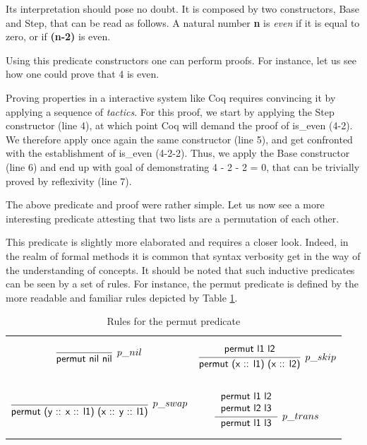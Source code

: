 			
	
	
	\noindent Its interpretation should pose no doubt. It is composed by two
	constructors, \textsf{Base} and \textsf{Step}, that can be read as follows.
	A natural number \textbf{n} is \textit{even} if it is equal to zero, 
	or if \textbf{(n-2)} is even. 
	
	Using this predicate constructors one can perform proofs. For instance,
	let us see how one could prove that 4 is even.
	
	
			
	
	\noindent Proving properties in a interactive system like Coq
	requires convincing it by applying a sequence of \textit{tactics}. For this 
	proof,	we start by applying the \textsf{Step} constructor (line 4), at which point
	Coq will demand the proof of \textsf{is\_even (4-2)}. We therefore apply once again
	the same constructor (line 5), and get confronted with the establishment of
	\textsf{is\_even (4-2-2)}. Thus, we apply the \textsf{Base} constructor (line 6)
	and end up with goal of demonstrating \textsf{4 - 2 - 2 = 0}, that can be
	trivially proved by reflexivity (line 7).
	
	The above predicate and proof were rather simple. Let us now see a more interesting
	predicate attesting that two lists are a permutation of each other.
		 
	
	
	\noindent This predicate is slightly more elaborated and requires a closer
	look. Indeed, in the realm of formal methods it is common that
	syntax verbosity get in the way of the 
	understanding of concepts. It should be noted that such inductive predicates
	can be seen by a set of rules. For instance, the \textsf{permut} predicate is defined
	by the more readable and familiar rules	depicted by Table \ref{tab:permutrules}.
	
		
\begin{table}[H]
\begin{tabular}{| c c |}
\hline
	 $$
\infer[p\_nil]{\textsf{permut nil nil}}{}
$$ 
& 
$$
\infer[p\_skip]{\textsf{permut (x :: l1) (x :: l2)}}
{  \begin{tabular}{ l } 
	   \textsf{permut l1 l2}   
	\end{tabular}} 
$$ \\
 & \\
$$
\infer[p\_swap]{\textsf{permut (y :: x :: l1) (x :: y :: l1)}}{ } 
$$ &   
$$
\infer[p\_trans]{\textsf{permut l1 l3}}
{  \begin{tabular}{ l } 
	   \textsf{permut l1 l2} \\
	   \textsf{permut l2 l3} \\
	\end{tabular}} 
$$ \\

 \hline
\end{tabular}	
\caption{Rules for the \textsf{permut} predicate}
\label{tab:permutrules}
\end{table}	
	

